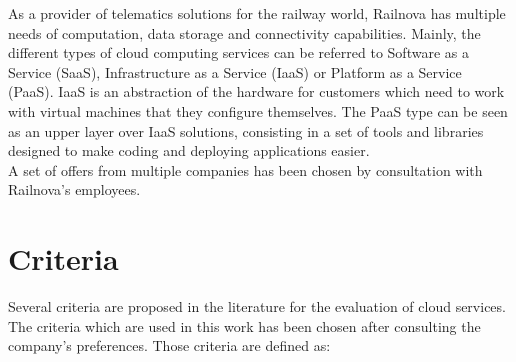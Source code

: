 \documentclass[a4paper,11pt]{article}
\begin{document}
As a provider of telematics solutions for the railway world, Railnova has multiple needs of computation, data storage and connectivity capabilities. Mainly, the different types of cloud computing services can be referred to Software as a Service (SaaS), Infrastructure as a Service (IaaS) or Platform as a Service (PaaS). IaaS is an abstraction of the hardware for customers which need to work with virtual machines that they configure themselves. The PaaS type can be seen as an upper layer over IaaS solutions, consisting in a set of tools and libraries designed to make coding and deploying applications easier.\\

A set of offers from multiple companies has been chosen by consultation with Railnova's employees. 

\section{Criteria}
Several criteria are proposed in the literature for the evaluation of cloud services. The criteria which are used in this work has been chosen after consulting the company's preferences.
Those criteria are defined as:
\end{document}
